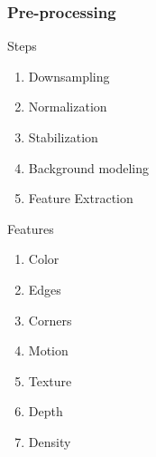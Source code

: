 \begin{frame}
\frametitle{Pre-processing}
\logoCSIPCPL\mypagenum
	{\color{red}Steps}
	\begin{enumerate}
		\item Downsampling
		\item Normalization
		\item Stabilization
		\item Background modeling
		\item Feature Extraction
	\end{enumerate}
	\vspace{0.3in}
	{\color{red}Features}
	\begin{enumerate}
		\item Color
		\item Edges
		\item Corners
		\item Motion
		\item Texture
		\item Depth
		\item Density
	\end{enumerate}
\end{frame}









